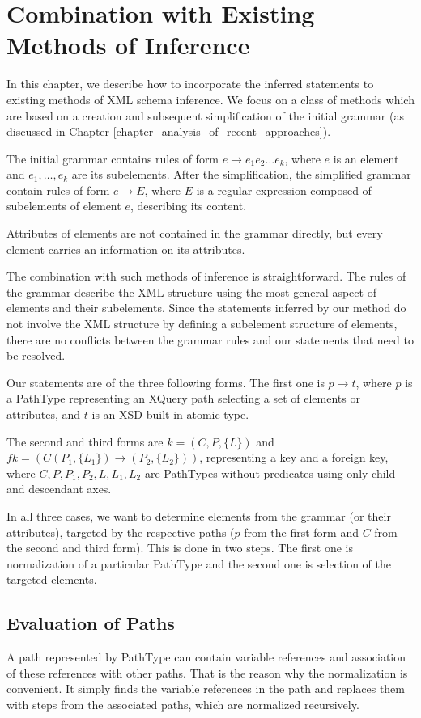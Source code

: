 \chapter{Combination with Existing Methods of Inference} \label{CHAPTER_combination_with_existings_methods_of_inference}
In this chapter, we describe how to incorporate the inferred statements to existing methods of XML schema inference. We focus on a class of methods which are based on a creation and subsequent simplification of the initial grammar (as discussed in Chapter \ref{chapter_analysis_of_recent_approaches}).

The initial grammar contains rules of form $e \rightarrow e_1e_2\dots e_k$, where $e$ is an element and $e_1, \dots , e_k$ are its subelements. After the simplification, the simplified grammar contain rules of form $e \rightarrow E$, where $E$ is a regular expression composed of subelements of element $e$, describing its content.

Attributes of elements are not contained in the grammar directly, but every element carries an information on its attributes.

The combination with such methods of inference is straightforward. The rules of the grammar describe the XML structure using the most general aspect of elements and their subelements. Since the statements inferred by our method do not involve the XML structure by defining a subelement structure of elements, there are no conflicts between the grammar rules and our statements that need to be resolved.

Our statements are of the three following forms. The first one is $p \rightarrow t$, where $p$ is a PathType representing an XQuery path selecting a set of elements or attributes, and $t$ is an XSD built-in atomic type.

The second and third forms are $k = (C,P,\{L\})$ and $fk = (C(P_1,\{L_1\}) \rightarrow (P_2,\{L_2\}))$, representing a key and a foreign key, where $C,P,P_1,P_2,L,L_1,L_2$ are PathTypes without predicates using only child and descendant axes.

In all three cases, we want to determine elements from the grammar (or their attributes), targeted by the respective paths ($p$ from the first form and $C$ from the second and third form). This is done in two steps. The first one is normalization of a particular PathType and the second one is selection of the targeted elements.

\section{Evaluation of Paths}
A path represented by PathType can contain variable references and association of these references with other paths. That is the reason why the normalization is convenient. It simply finds the variable references in the path and replaces them with steps from the associated paths, which are normalized recursively.

